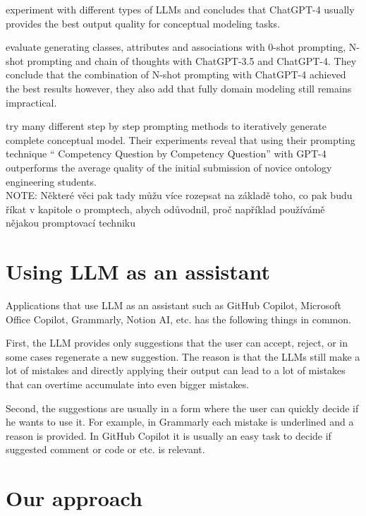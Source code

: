 \citet{BabaeiGiglou2023} experiment with different types of LLMs and concludes that ChatGPT-4 usually provides the best output quality for conceptual modeling tasks.

\citet{Chen2023} evaluate generating classes, attributes and associations with 0-shot prompting, N-shot prompting and chain of thoughts with ChatGPT-3.5 and ChatGPT-4. They conclude that the combination of N-shot prompting with ChatGPT-4 achieved the best results however, they also add that fully domain modeling still remains impractical.

\citet{Saeedizade2024} try many different step by step prompting methods to iteratively generate complete conceptual model. Their experiments reveal that using their prompting technique `` Competency Question by Competency Question'' with GPT-4 outperforms the average quality of the initial submission of novice ontology engineering students. \\


NOTE: Některé věci pak tady můžu více rozepsat na základě toho, co pak budu říkat v kapitole o promptech, abych odůvodnil, proč například používámě nějakou promptovací techniku \\


\section{Using LLM as an assistant}
\label{section:llm_as_an_assistant}

Applications that use LLM as an assistant such as GitHub Copilot, Microsoft Office Copilot, Grammarly, Notion AI, etc. has the following things in common.

First, the LLM provides only suggestions that the user can accept, reject, or in some cases regenerate a new suggestion. The reason is that the LLMs still make a lot of mistakes and directly applying their output can lead to a lot of mistakes that can overtime accumulate into even bigger mistakes.

Second, the suggestions are usually in a form where the user can quickly decide if he wants to use it. For example, in Grammarly each mistake is underlined and a reason is provided. In GitHub Copilot it is usually an easy task to decide if suggested comment or code or etc. is relevant.


\section{Our approach}

